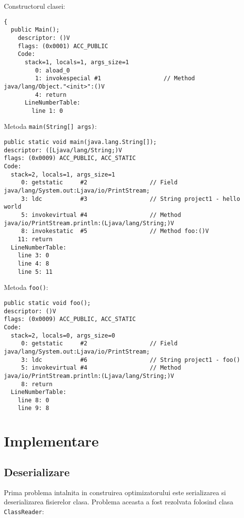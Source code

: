 \documentclass[]{article}
\begin{document}
Constructorul clasei:

\begin{verbatim}
{
  public Main();
    descriptor: ()V
    flags: (0x0001) ACC_PUBLIC
    Code:
      stack=1, locals=1, args_size=1
         0: aload_0
         1: invokespecial #1                  // Method java/lang/Object."<init>":()V
         4: return
      LineNumberTable:
        line 1: 0
\end{verbatim}

Metoda \texttt{main(String{[}{]}\ args)}:

\begin{verbatim}
public static void main(java.lang.String[]);
descriptor: ([Ljava/lang/String;)V
flags: (0x0009) ACC_PUBLIC, ACC_STATIC
Code:
  stack=2, locals=1, args_size=1
     0: getstatic     #2                  // Field java/lang/System.out:Ljava/io/PrintStream;
     3: ldc           #3                  // String project1 - hello world
     5: invokevirtual #4                  // Method java/io/PrintStream.println:(Ljava/lang/String;)V
     8: invokestatic  #5                  // Method foo:()V
    11: return
  LineNumberTable:
    line 3: 0
    line 4: 8
    line 5: 11
\end{verbatim}

Metoda \texttt{foo()}:

\begin{verbatim}
public static void foo();
descriptor: ()V
flags: (0x0009) ACC_PUBLIC, ACC_STATIC
Code:
  stack=2, locals=0, args_size=0
     0: getstatic     #2                  // Field java/lang/System.out:Ljava/io/PrintStream;
     3: ldc           #6                  // String project1 - foo()
     5: invokevirtual #4                  // Method java/io/PrintStream.println:(Ljava/lang/String;)V
     8: return
  LineNumberTable:
    line 8: 0
    line 9: 8
\end{verbatim}

\section{Implementare}\label{implementare}

\subsection{Deserializare}\label{deserializare}

Prima problema intalnita in construirea optimizatorului este
serializarea si deserializarea fisierelor clasa. Problema aceasta a fost
rezolvata folosind clasa \texttt{ClassReader}:
\end{document}
